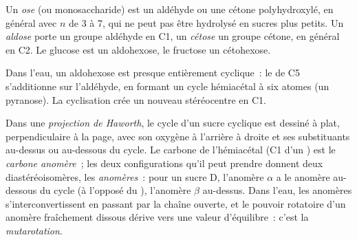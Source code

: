 \begin{definition}[Oses]\label{def:b2:biomolecules:sugar}
Un \emph{ose} (ou monosaccharide) est un aldéhyde ou une cétone polyhydroxylé, en général
 avec $n$ de 3 à 7, qui ne peut pas être hydrolysé en sucres plus petits. Un
\emph{aldose} porte un groupe aldéhyde en C1, un \emph{cétose} un
groupe cétone, en général en C2. Le glucose est un aldohexose, le fructose un cétohexose.
\end{definition}

Dans l'eau, un aldohexose est presque entièrement cyclique~: le  de C5 s'additionne sur
l'aldéhyde, en formant un cycle hémiacétal à six atomes (un pyranose). La cyclisation crée un nouveau
stéréocentre en C1.

\begin{definition}[Anomères]\label{def:b2:biomolecules:anomer}
Dans une \emph{projection de Haworth}, le cycle d'un sucre cyclique est
dessiné à plat, perpendiculaire à la page, avec son oxygène à l'arrière à droite et ses substituants
au-dessus ou au-dessous du cycle. Le carbone de l'hémiacétal (C1 d'un ) est le \emph{carbone
anomère}~; les deux configurations qu'il peut prendre donnent deux
diastéréoisomères, les \emph{anomères}~: pour un sucre D, l'anomère $\alpha$ a le
 anomère au-dessous du cycle (à l'opposé du ), l'anomère $\beta$ au-dessus. Dans l'eau,
les anomères s'interconvertissent en passant par la chaîne ouverte, et le pouvoir rotatoire d'un anomère
fraîchement dissous dérive vers une valeur d'équilibre~: c'est la \emph{mutarotation}.
\end{definition}

